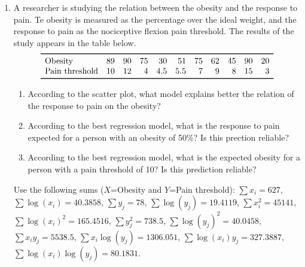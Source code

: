 \begin{enumerate}[leftmargin=*,resume]
\item A researcher is studying the relation between the obesity and the response to pain. 
Te obesity is measured as the percentage over the ideal weight, and the response to pain as the nociceptive flexion pain
threshold.
The results of the study appears in the table below.
\[
\begin{array}{lrrrrrrrrrr}
\toprule
\mbox{Obesity} & 89 & 90 & 75 & 30 & 51 & 75 & 62 & 45 & 90 & 20\\
\mbox{Pain threshold} & 10 & 12 & 4 & 4.5 & 5.5 & 7 & 9 & 8 & 15 & 3\\
\bottomrule
\end{array}
\]
\begin{enumerate}
\item According to the scatter plot, what model explains better the relation of the response to pain on the
obesity?
\item According to the best regression model, what is the response to pain expected for a person with an obesity of
50\%? Is this prection reliable?
\item According to the best regression model, what is the expected obesity for a person with a pain threshold of
10? Is this prediction reliable?
\end{enumerate}
Use the following sums ($X$=Obesity and $Y$=Pain threshold): $\sum x_i=627$, $\sum \log(x_i)=40.3858$, $\sum y_j=78$,
$\sum \log(y_j)=19.4119$, $\sum x_i^2=45141$, $\sum \log(x_i)^2=165.4516$, $\sum y_j^2=738.5$, $\sum
\log(y_j)^2=40.0458$, $\sum x_iy_j=5538.5$, $\sum x_i\log(y_j)=1306.051$, $\sum \log(x_i)y_j=327.3887$, $\sum
\log(x_i)\log(y_j)=80.1831$.

\end{enumerate}

